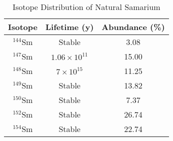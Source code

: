 \begin{table}[]
    \centering
    \caption{Isotope Distribution of Natural Samarium}
    \label{tab:nat_Sm}
    \begin{tabular}{c|c|c}
    \toprule
         Isotope & Lifetime (y) & Abundance (\%)  \\
         \hline
         $^{144}$Sm & Stable & 3.08 \\
         $^{147}$Sm & $1.06\times10^{11}$ & 15.00 \\
         $^{148}$Sm & $7\times10^{15}$ & 11.25 \\
         $^{149}$Sm & Stable & 13.82 \\
         $^{150}$Sm & Stable & 7.37 \\
         $^{152}$Sm & Stable & 26.74 \\
         $^{154}$Sm & Stable & 22.74 \\
         \bottomrule
    \end{tabular}
\end{table}